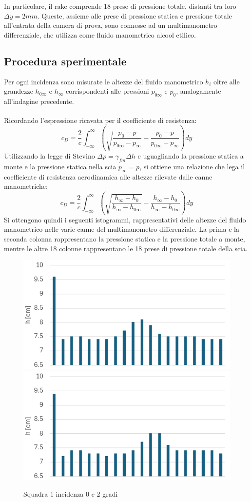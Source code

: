 \noindent In particolare, il rake comprende 18 prese di pressione totale, distanti tra loro $\Delta y= 2mm$. Queste, assieme alle prese di pressione statica e pressione totale all'entrata della camera di prova, sono connesse ad un multimanometro differenziale, che utilizza come fluido manometrico alcool etilico.

\subsection{Procedura sperimentale}\label{istogrammiscia}
Per ogni incidenza sono misurate le altezze del fluido manometrico $h_i$ oltre alle grandezze $h_{0\infty}$ e $h_\infty$ corrispondenti alle pressioni $p_{0\infty}$ e $p_0$, analogamente all'indagine precedente.\\\\
Ricordando l'espressione ricavata per il coefficiente di resistenza:
\begin{equation*}
    c_D = \frac 2c \int_{-\infty}^{\infty} \left( \sqrt{\frac{p_0 - p}{p_{0\infty} - p_\infty}} - \frac{p_0 - p}{p_{0\infty} - p_\infty} \right) dy
\end{equation*}
Utilizzando la legge di Stevino $\Delta p = \gamma_{fm} \Delta h$ e uguagliando la pressione statica a monte e la pressione statica nella scia $p_{\infty}=p$, si ottiene una relazione che lega il coefficiente di resistenza aerodinamica alle altezze rilevate dalle canne manometriche:
\begin{equation*}
    c_D = \frac 2c \int_{-\infty}^\infty \left( \sqrt{\frac{h_\infty - h_0}{h_\infty - h_{0\infty}}} - \frac{h_\infty - h_0}{h_\infty - h_{0\infty}} \right) dy 
\end{equation*}
Si ottengono quindi i seguenti istogrammi, rappresentativi delle altezze del fluido manometrico nelle varie canne del multimanometro differenziale. La prima e la seconda colonna rappresentano la pressione statica e la pressione totale a monte, mentre le altre 18 colonne rappresentano le 18 prese di pressione totale della scia.
\begin{figure}[H]
    \centering
    \includegraphics[width=.49\textwidth]{images/6/s1a0.png}
    \includegraphics[width=.49\textwidth]{images/6/s1a2.png}
    \caption{Squadra 1 incidenza 0 e 2 gradi}
\end{figure}
